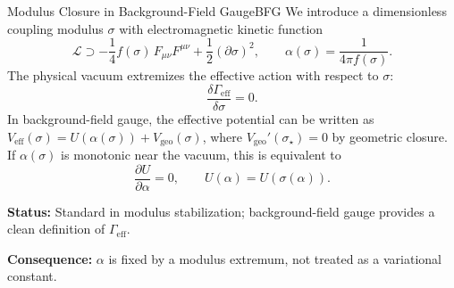 \begin{axiom}{Modulus Closure in Background-Field Gauge}{BFG}
We introduce a dimensionless coupling modulus $\sigma$ with electromagnetic kinetic function
\begin{equation}
    \mathcal{L} \supset -\frac{1}{4} f(\sigma)\,F_{\mu\nu}F^{\mu\nu}
    + \frac{1}{2}(\partial\sigma)^2,
    \qquad 
    \alpha(\sigma)=\frac{1}{4\pi f(\sigma)}.
\end{equation}
The physical vacuum extremizes the effective action with respect to $\sigma$:
\begin{equation}
    \frac{\delta\Gamma_{\mathrm{eff}}}{\delta\sigma}=0.
\end{equation}
In background-field gauge, the effective potential can be written as
$V_{\mathrm{eff}}(\sigma)=U(\alpha(\sigma)) + V_{\mathrm{geo}}(\sigma)$, where
$V_{\mathrm{geo}}'(\sigma_\star)=0$ by geometric closure.
If $\alpha(\sigma)$ is monotonic near the vacuum, this is equivalent to
\begin{equation}
    \frac{\partial U}{\partial \alpha}=0,
    \qquad U(\alpha)=U(\sigma(\alpha)).
\end{equation}

\tcblower
\textbf{Status:} Standard in modulus stabilization; background-field gauge provides a clean definition of $\Gamma_{\mathrm{eff}}$.

\textbf{Consequence:} $\alpha$ is fixed by a modulus extremum, not treated as a variational constant.
\end{axiom}

